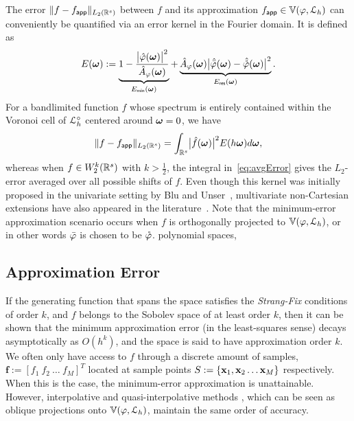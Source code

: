 The error $\lVert f - f_{\mathsf{app}} \rVert_{L_2(\mathbb{R}^s)}$ between $f$ and its approximation
$f_{\mathsf{app}} \in \mathbb{V}({\varphi},{\mathcal{L}_h})$ can conveniently be
quantified via an error kernel in the Fourier domain. It is defined as
\begin{equation}
  E(\vect{\omega}) := \underbrace{1 - \frac{\abs{\ft{\varphi}(\vect{\omega})}^2}{\ft{A}_{\varphi}(\vect{\omega})}}_{E_{\mathsf{min}}(\vect{\omega})}
  + 
  \underbrace{
    \ft{A}_{\varphi}(\vect{\omega})
    \abs{\ft{\analysis{\varphi}}(\vect{\omega}) -
      \ft{\dual{\varphi}}(\vect{\omega})}^2
  }_{E_{\mathsf{res}}(\vect{\omega})}.
  \label{eq:scErrorKernel}
\end{equation}
For a bandlimited function $f$ whose spectrum is entirely contained
within the Voronoi cell of $\mathcal{L}^{\circ}_h$ centered around
$\boldsymbol{\omega} = 0$, we have 
\begin{equation}
\Ltwonorm{f - \appf{f}} = \int_{\reel^s}
\abs{\ft{f}(\vect{\omega})}^2 E(h\vect{\omega}) d\vect{\omega},
\label{eq:avgError}
\end{equation}
whereas when $f \in W_2^k(\mathbb{R}^s)$ with $k > \frac{1}{2}$, the
integral in~\eqref{eq:avgError} gives the $L_2$-error averaged over
all possible shifts of $f$. Even though this kernel was initially
proposed in the univariate setting by Blu and Unser~\cite{blu99}, multivariate
non-Cartesian extensions have also appeared in the
literature~\cite{condat05hexagonal, condat07, condat08, alim10,
  condat11}. Note that the minimum-error approximation scenario occurs
when $f$ is orthogonally projected to $\mathbb{V}({\varphi},{\mathcal{L}_h})$,
or in other words ${\bar{\varphi}}$ is chosen to be  ${\mathring{\varphi}}$.
 polynomial spaces, 
 
\subsection{Approximation Error}

If the generating function that spans the space satisfies the \emph{Strang-Fix} conditions of order $k$, and $f$ belongs to the Sobolev space of at least order $k$, then it can be shown that the minimum approximation error (in the least-squares sense) decays asymptotically as $O(h^k)$, and the space is said to have approximation order $k$. We often only have access to $f$ through a discrete amount of samples, $\mathbf{f} := \left[ f_1 \ f_2 \ \hdots \ f_M \right]^T$ located at sample points $S := \{\mathbf{x}_1, \mathbf{x}_2 \hdots \mathbf{x}_M \}$ respectively. When this is the case, the minimum-error approximation is unattainable. However, interpolative and quasi-interpolative methods \cite{quasibcc,interprev}, which can be seen as oblique projections onto $\mathbb{V}({\varphi},{\mathcal{L}_h})$, maintain the same order of accuracy.


